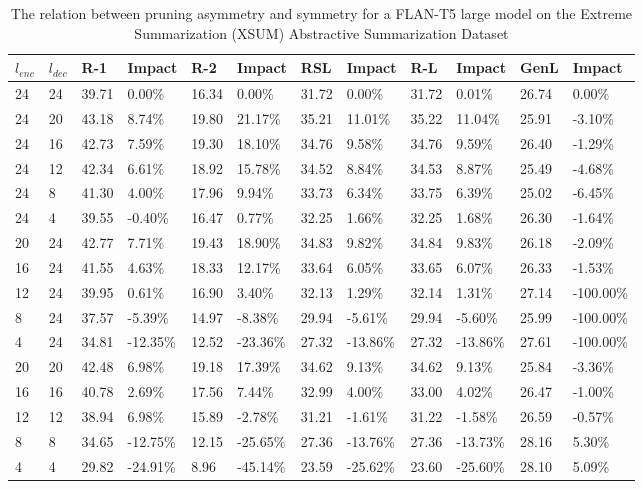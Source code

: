 \begin{table*}[!ht]
    \centering
    \caption{The relation between pruning asymmetry and symmetry for a FLAN-T5 large model on the Extreme Summarization (XSUM) Abstractive Summarization Dataset}
    \small
    \begin{tabular}{|l|l|l|l|l|l|l|l|l|l|l|l|}
    \hline
        $l_{enc}$ & $l_{dec}$ & R-1 & Impact & R-2 & Impact & RSL & Impact & R-L & Impact & GenL & Impact \\ \hline
        24 & 24 & 39.71 & 0.00\% & 16.34 & 0.00\% & 31.72 & 0.00\% & 31.72 & 0.01\% & 26.74 & 0.00\% \\ \hline
        24 & 20 & 43.18 & 8.74\% & 19.80 & 21.17\% & 35.21 & 11.01\% & 35.22 & 11.04\% & 25.91 & -3.10\% \\ \hline
        24 & 16 & 42.73 & 7.59\% & 19.30 & 18.10\% & 34.76 & 9.58\% & 34.76 & 9.59\% & 26.40 & -1.29\% \\ \hline
        24 & 12 & 42.34 & 6.61\% & 18.92 & 15.78\% & 34.52 & 8.84\% & 34.53 & 8.87\% & 25.49 & -4.68\% \\ \hline
        24 & 8 & 41.30 & 4.00\% & 17.96 & 9.94\% & 33.73 & 6.34\% & 33.75 & 6.39\% & 25.02 & -6.45\% \\ \hline
        24 & 4 & 39.55 & -0.40\% & 16.47 & 0.77\% & 32.25 & 1.66\% & 32.25 & 1.68\% & 26.30 & -1.64\% \\ \hline
        20 & 24 & 42.77 & 7.71\% & 19.43 & 18.90\% & 34.83 & 9.82\% & 34.84 & 9.83\% & 26.18 & -2.09\% \\ \hline
        16 & 24 & 41.55 & 4.63\% & 18.33 & 12.17\% & 33.64 & 6.05\% & 33.65 & 6.07\% & 26.33 & -1.53\% \\ \hline
        12 & 24 & 39.95 & 0.61\% & 16.90 & 3.40\% & 32.13 & 1.29\% & 32.14 & 1.31\% & 27.14 & -100.00\% \\ \hline
        8 & 24 & 37.57 & -5.39\% & 14.97 & -8.38\% & 29.94 & -5.61\% & 29.94 & -5.60\% & 25.99 & -100.00\% \\ \hline
        4 & 24 & 34.81 & -12.35\% & 12.52 & -23.36\% & 27.32 & -13.86\% & 27.32 & -13.86\% & 27.61 & -100.00\% \\ \hline
        20 & 20 & 42.48 & 6.98\% & 19.18 & 17.39\% & 34.62 & 9.13\% & 34.62 & 9.13\% & 25.84 & -3.36\% \\ \hline
        16 & 16 & 40.78 & 2.69\% & 17.56 & 7.44\% & 32.99 & 4.00\% & 33.00 & 4.02\% & 26.47 & -1.00\% \\ \hline
        12 & 12 & 38.94 & 6.98\% & 15.89 & -2.78\% & 31.21 & -1.61\% & 31.22 & -1.58\% & 26.59 & -0.57\% \\ \hline
        8 & 8 & 34.65 & -12.75\% & 12.15 & -25.65\% & 27.36 & -13.76\% & 27.36 & -13.73\% & 28.16 & 5.30\% \\ \hline
        4 & 4 & 29.82 & -24.91\% & 8.96 & -45.14\% & 23.59 & -25.62\% & 23.60 & -25.60\% & 28.10 & 5.09\% \\ \hline
    \end{tabular}
    \label{tab:asym-large-xsum}
\end{table*}